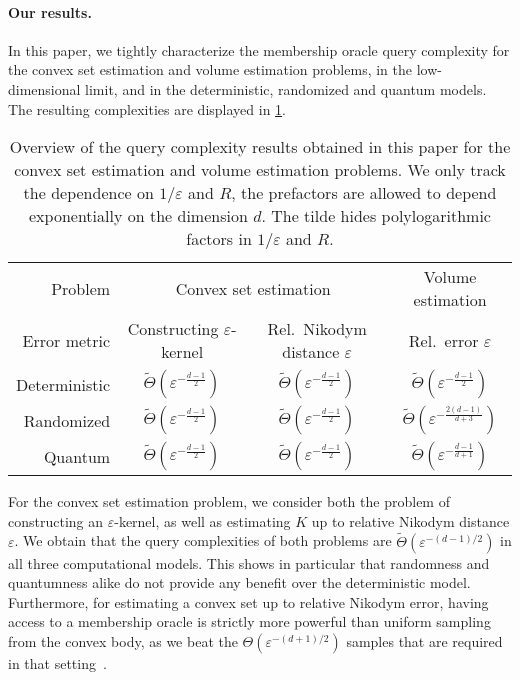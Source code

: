 \documentclass[11pt]{article}
\begin{document}
    \paragraph{Our results.}

    In this paper, we tightly characterize the membership oracle query complexity for the convex set estimation and volume estimation problems, in the low-dimensional limit, and in the deterministic, randomized and quantum models. The resulting complexities are displayed in \cref{tbl:results}.

    \begin{table}[!ht]
        \centering
        \begin{tabular}{r|cc|c}
            Problem & \multicolumn{2}{c|}{Convex set estimation} & Volume estimation \\
            Error metric & Constructing $\varepsilon$-kernel & Rel.\ Nikodym distance $\varepsilon$ & Rel.\ error $\varepsilon$ \\\hline
            Deterministic & $\widetilde{\Theta}(\varepsilon^{-\frac{d-1}{2}})$ & $\widetilde{\Theta}(\varepsilon^{-\frac{d-1}{2}})$ & $\widetilde{\Theta}(\varepsilon^{-\frac{d-1}{2}})$ \\
            Randomized & $\widetilde{\Theta}(\varepsilon^{-\frac{d-1}{2}})$ & $\widetilde{\Theta}(\varepsilon^{-\frac{d-1}{2}})$ & $\widetilde{\Theta}(\varepsilon^{-\frac{2(d-1)}{d+3}})$ \\
            Quantum & $\widetilde{\Theta}(\varepsilon^{-\frac{d-1}{2}})$ & $\widetilde{\Theta}(\varepsilon^{-\frac{d-1}{2}})$ & $\widetilde{\Theta}(\varepsilon^{-\frac{d-1}{d+1}})$ \\
        \end{tabular}
        \caption{Overview of the query complexity results obtained in this paper for the convex set estimation and volume estimation problems. We only track the dependence on $1/\varepsilon$ and $R$, the prefactors are allowed to depend exponentially on the dimension $d$. The tilde hides polylogarithmic factors in $1/\varepsilon$ and $R$.}
        \label{tbl:results}
    \end{table}

    For the convex set estimation problem, we consider both the problem of constructing an $\varepsilon$-kernel, as well as estimating $K$ up to relative Nikodym distance $\varepsilon$. We obtain that the query complexities of both problems are $\widetilde{\Theta}(\varepsilon^{-(d-1)/2})$ in all three computational models. This shows in particular that randomness and quantumness alike do not provide any benefit over the deterministic model. Furthermore, for estimating a convex set up to relative Nikodym error, having access to a membership oracle is strictly more powerful than uniform sampling from the convex body, as we beat the $\Theta(\varepsilon^{-(d+1)/2})$ samples that are required in that setting~\cite{brunel2016adaptive}.
\end{document}
